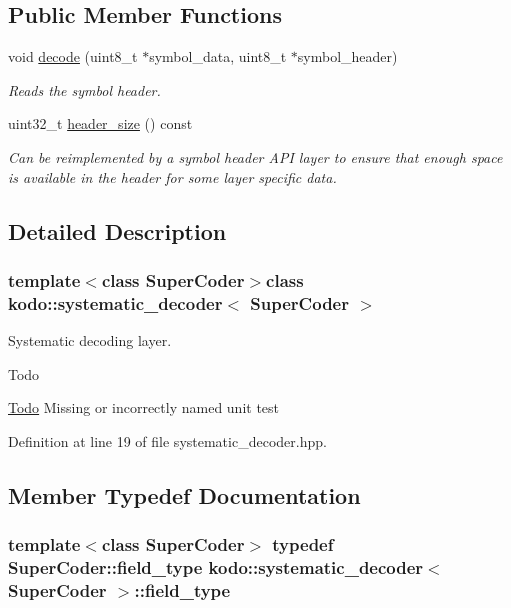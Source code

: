 \subsection*{Public Member Functions}
\begin{DoxyCompactItemize}
\item 
void \hyperlink{classkodo_1_1systematic__decoder_a8209e020940f278fc841e8ec4805d4ea}{decode} (uint8\-\_\-t $\ast$symbol\-\_\-data, uint8\-\_\-t $\ast$symbol\-\_\-header)
\begin{DoxyCompactList}\small\item\em Reads the symbol header. \end{DoxyCompactList}\item 
uint32\-\_\-t \hyperlink{classkodo_1_1systematic__decoder_ab258bc9e644378186a88921b4f877b6a}{header\-\_\-size} () const 
\begin{DoxyCompactList}\small\item\em Can be reimplemented by a symbol header A\-P\-I layer to ensure that enough space is available in the header for some layer specific data. \end{DoxyCompactList}\end{DoxyCompactItemize}


\subsection{Detailed Description}
\subsubsection*{template$<$class Super\-Coder$>$class kodo\-::systematic\-\_\-decoder$<$ Super\-Coder $>$}

Systematic decoding layer. 

\begin{DoxyRefDesc}{Todo}
\item[\hyperlink{todo__todo000065}{Todo}]Missing or incorrectly named unit test\end{DoxyRefDesc}


Definition at line 19 of file systematic\-\_\-decoder.\-hpp.



\subsection{Member Typedef Documentation}
\hypertarget{classkodo_1_1systematic__decoder_a1852a220ecbed3f15a42741e895ee3f7}{
\subsubsection[{field\-\_\-type}]{\setlength{\rightskip}{0pt plus 5cm}template$<$class Super\-Coder$>$ typedef Super\-Coder\-::field\-\_\-type {\bf kodo\-::systematic\-\_\-decoder}$<$ Super\-Coder $>$\-::{\bf field\-\_\-type}}}\label{classkodo_1_1systematic__decoder_a1852a220ecbed3f15a42741e895ee3f7}




